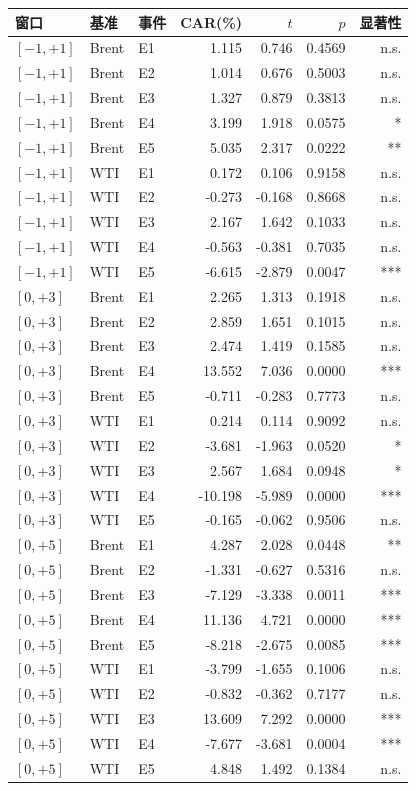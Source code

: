 \begin{tabular}{lllrrrr}
\toprule
窗口 & 基准 & 事件 & CAR(\%) & $t$ & $p$ & 显著性 \\
\midrule
$[-1,+1]$ & Brent & E1 & 1.115 & 0.746 & 0.4569 & n.s. \\
$[-1,+1]$ & Brent & E2 & 1.014 & 0.676 & 0.5003 & n.s. \\
$[-1,+1]$ & Brent & E3 & 1.327 & 0.879 & 0.3813 & n.s. \\
$[-1,+1]$ & Brent & E4 & 3.199 & 1.918 & 0.0575 & * \\
$[-1,+1]$ & Brent & E5 & 5.035 & 2.317 & 0.0222 & ** \\
$[-1,+1]$ & WTI & E1 & 0.172 & 0.106 & 0.9158 & n.s. \\
$[-1,+1]$ & WTI & E2 & -0.273 & -0.168 & 0.8668 & n.s. \\
$[-1,+1]$ & WTI & E3 & 2.167 & 1.642 & 0.1033 & n.s. \\
$[-1,+1]$ & WTI & E4 & -0.563 & -0.381 & 0.7035 & n.s. \\
$[-1,+1]$ & WTI & E5 & -6.615 & -2.879 & 0.0047 & *** \\
$[0,+3]$ & Brent & E1 & 2.265 & 1.313 & 0.1918 & n.s. \\
$[0,+3]$ & Brent & E2 & 2.859 & 1.651 & 0.1015 & n.s. \\
$[0,+3]$ & Brent & E3 & 2.474 & 1.419 & 0.1585 & n.s. \\
$[0,+3]$ & Brent & E4 & 13.552 & 7.036 & 0.0000 & *** \\
$[0,+3]$ & Brent & E5 & -0.711 & -0.283 & 0.7773 & n.s. \\
$[0,+3]$ & WTI & E1 & 0.214 & 0.114 & 0.9092 & n.s. \\
$[0,+3]$ & WTI & E2 & -3.681 & -1.963 & 0.0520 & * \\
$[0,+3]$ & WTI & E3 & 2.567 & 1.684 & 0.0948 & * \\
$[0,+3]$ & WTI & E4 & -10.198 & -5.989 & 0.0000 & *** \\
$[0,+3]$ & WTI & E5 & -0.165 & -0.062 & 0.9506 & n.s. \\
$[0,+5]$ & Brent & E1 & 4.287 & 2.028 & 0.0448 & ** \\
$[0,+5]$ & Brent & E2 & -1.331 & -0.627 & 0.5316 & n.s. \\
$[0,+5]$ & Brent & E3 & -7.129 & -3.338 & 0.0011 & *** \\
$[0,+5]$ & Brent & E4 & 11.136 & 4.721 & 0.0000 & *** \\
$[0,+5]$ & Brent & E5 & -8.218 & -2.675 & 0.0085 & *** \\
$[0,+5]$ & WTI & E1 & -3.799 & -1.655 & 0.1006 & n.s. \\
$[0,+5]$ & WTI & E2 & -0.832 & -0.362 & 0.7177 & n.s. \\
$[0,+5]$ & WTI & E3 & 13.609 & 7.292 & 0.0000 & *** \\
$[0,+5]$ & WTI & E4 & -7.677 & -3.681 & 0.0004 & *** \\
$[0,+5]$ & WTI & E5 & 4.848 & 1.492 & 0.1384 & n.s. \\
\bottomrule
\end{tabular}
